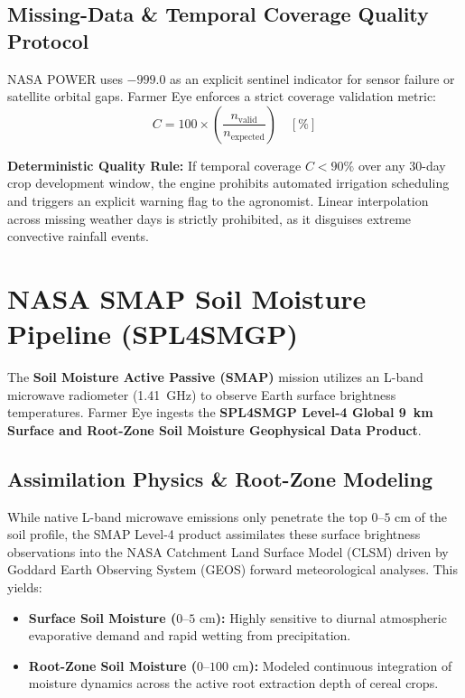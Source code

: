 \documentclass[11pt,a4paper,oneside]{report}
\begin{document}
\subsection{Missing-Data \& Temporal Coverage Quality Protocol}
NASA POWER uses $-999.0$ as an explicit sentinel indicator for sensor failure or satellite orbital gaps. Farmer Eye enforces a strict coverage validation metric:
\begin{equation}
C = 100 \times \left( \frac{n_{\text{valid}}}{n_{\text{expected}}} \right) \quad [\%]
\end{equation}
\begin{notebox}
\textbf{Deterministic Quality Rule:} If temporal coverage $C < 90\%$ over any 30-day crop development window, the engine prohibits automated irrigation scheduling and triggers an explicit warning flag to the agronomist. Linear interpolation across missing weather days is strictly prohibited, as it disguises extreme convective rainfall events.
\end{notebox}

\section{NASA SMAP Soil Moisture Pipeline (SPL4SMGP)}
The \textbf{Soil Moisture Active Passive (SMAP)} mission utilizes an L-band microwave radiometer (1.41~GHz) to observe Earth surface brightness temperatures. Farmer Eye ingests the \textbf{SPL4SMGP Level-4 Global 9~km Surface and Root-Zone Soil Moisture Geophysical Data Product}.

\subsection{Assimilation Physics \& Root-Zone Modeling}
While native L-band microwave emissions only penetrate the top $0–5\text{ cm}$ of the soil profile, the SMAP Level-4 product assimilates these surface brightness observations into the NASA Catchment Land Surface Model (CLSM) driven by Goddard Earth Observing System (GEOS) forward meteorological analyses. This yields:
\begin{itemize}[leftmargin=*]
    \item \textbf{Surface Soil Moisture ($0–5\text{ cm}$):} Highly sensitive to diurnal atmospheric evaporative demand and rapid wetting from precipitation.
    \item \textbf{Root-Zone Soil Moisture ($0–100\text{ cm}$):} Modeled continuous integration of moisture dynamics across the active root extraction depth of cereal crops.
\end{itemize}
\end{document}

